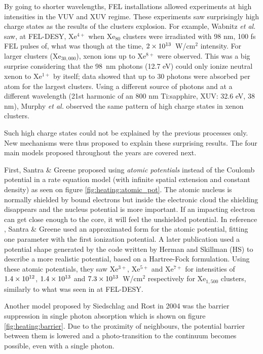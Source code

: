 By going to shorter wavelengths, FEL installations allowed experiments at high
intensities in the VUV and XUV regime. These experiments saw surprisingly
high charge states as the results of the clusters
explosion\cite{Wabnitz2002,Bostedt2010}. For example, Wabnitz \textit{et al.}
saw, at FEL-DESY, Xe$^{4+}$ when Xe$_{80}$ clusters were irradiated with 98 nm,
100 fs FEL pulses of, what was though at the time, $\ten{2}{13}$~W/cm$^2$
intensity. For larger clusters (Xe$_{30,000}$), xenon ions up to
Xe$^{8+}$ were observed. This was a big surprise considering that the 98~nm
photons (12.7 eV) could only ionize neutral xenon to Xe$^{1+}$ by itself;
data showed that up to 30 photons were absorbed per atom for the largest
clusters. Using a different source of photons and at a different wavelength
(21st harmonic of an 800 nm Ti:sapphire, XUV: 32.6 eV, 38 nm),
Murphy \textit{et al.} observed the same pattern of high charge states in xenon
clusters\cite{Murphy2008a,Murphy2008b}.

Such high charge states could not be explained by the previous processes only.
New mechanisms were thus proposed to explain these surprising results.
The four main models proposed throughout the years are covered next.



First, Santra \& Greene proposed using \textit{atomic potentials} instead of
the Coulomb potential in a rate equation model (with infinite spatial
extension and
constant density) as seen on figure \ref{fig:heating:atomic_pot}.
The atomic nucleus is normally shielded by bound electrons but inside the
electronic cloud the shielding disappears and the nucleus potential is more
important. If an impacting electron can get close enough to the core, it will
feel the unshielded potential.
In reference \cite{Greene2003}, Santra \& Greene used an approximated form for
the atomic potential, fitting one parameter with the first ionization potential.
A later\cite{Walters2006} publication used a
potential shape generated by the code written by Herman and
Skillman\cite{HS1963} (HS) to describe a more realistic
potential, based on a
Hartree-Fock formulation. Using these atomic potentials, they saw Xe$^{3+}$,
Xe$^{5+}$ and Xe$^{7+}$ for intensities of $\ten{1.4}{12}$, $\ten{1.4}{13}$ and
$\ten{7.3}{13}$~W/cm$^2$ respectively for Xe$_{1,500}$ clusters, similarly to
what was seen in at FEL-DESY.

\newpage
{}

Another model proposed by Siedschlag and Rost\cite{Siedschlag2004} in 2004 was
the barrier suppression in single photon absorption which is shown on figure
\ref{fig:heating:barrier}. Due to the proximity
of neighbours, the potential barrier between them is lowered and
a photo-transition to the continuum becomes possible, even with a single photon.

